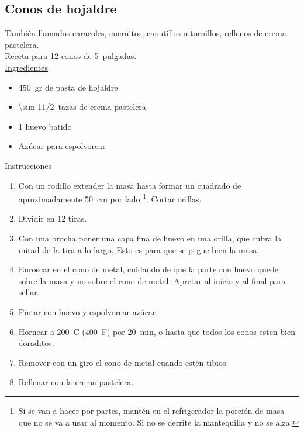 \subsection{Conos de hojaldre}
\label{sec:conos-hojaldre}

También llamados caracoles, cuernitos, canutillos o tornillos, rellenos de crema pastelera. \\

Receta para 12 conos de \SI{5}{pulgadas}.\\

\underline{Ingredientes}

\begin{itemize}
\item \SI{450}{gr} de pasta de hojaldre
\item \num{\sim 1}\SI{1/2}{tazas} de crema pastelera
\item 1 huevo batido
\item Azúcar para espolvorear
\end{itemize}

\underline{Instrucciones}

\begin{enumerate}
\item Con un rodillo extender la masa hasta formar un cuadrado de aproximadamente \SI{50}{cm} por lado \footnote{Si se van a hacer por partes, mantén en el refrigerador la porción de masa que no se va a usar al momento. Si no se derrite la mantequilla y no se alza.}. Cortar orillas.
\item Dividir en 12 tiras.
\item Con una brocha poner una capa fina de huevo en una orilla, que cubra la mitad de la tira a lo largo. Esto es para que se pegue bien la masa.
\item Enroscar en el cono de metal, cuidando de que la parte con huevo quede sobre la masa y no sobre el cono de metal. Apretar al inicio y al final para sellar.
\item Pintar con huevo y espolvorear azúcar.
\item Hornear a \SI{200}{C} (\SI{400}{F}) por \SI{20}{min}, o hasta que todos los conos esten bien doraditos.
\item Remover con un giro el cono de metal cuando estén tibios.
\item Rellenar con la crema pastelera.
\end{enumerate}

